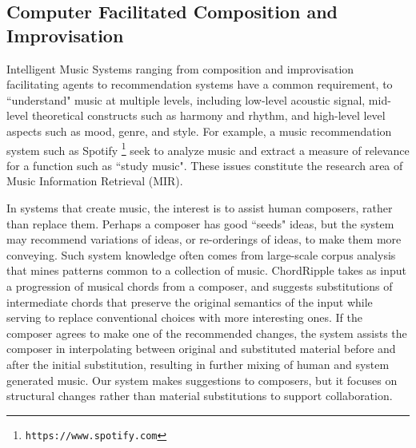 \documentclass[final,authoryear,5p,times,twocolumn]{elsarticle}
\begin{document}
\subsection{Computer Facilitated Composition and Improvisation}

Intelligent Music Systems ranging from composition and improvisation facilitating agents to recommendation systems have a common requirement, to ``understand" music at multiple levels, including low-level acoustic signal, mid-level theoretical constructs such as harmony and rhythm, and high-level level aspects such as mood, genre, and style. For example, a music recommendation system such as Spotify \footnote{\texttt{https://www.spotify.com}} seek to analyze music and extract a measure of relevance for a function such as ``study music". These issues constitute the research area of Music Information Retrieval (MIR).

In systems that create music, the interest is to assist human composers, rather than replace them. Perhaps a composer has good ``seeds" ideas, but the system may recommend variations of ideas, or re-orderings of ideas, to make them more conveying. Such system knowledge often comes from large-scale corpus analysis that mines patterns common to a collection of music. ChordRipple \citep{huang2016chordripple} takes as input a progression of musical chords from a composer, and suggests substitutions of intermediate chords that preserve the original semantics of the input while serving to replace conventional choices with more interesting ones. If the composer agrees to make one of the recommended changes, the system assists the composer in interpolating between original and substituted material before and after the initial substitution, resulting in further mixing of human and system generated music. Our system makes suggestions to composers, but it focuses on structural changes rather than material substitutions to support collaboration.
\end{document}
